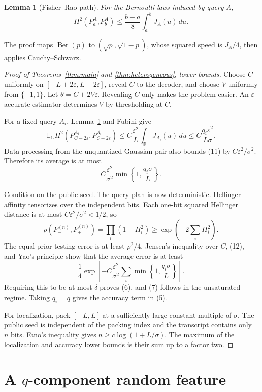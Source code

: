 \documentclass{article}
\newtheorem{lemma}[theorem]{Lemma}
\theoremstyle{definition}
\theoremstyle{remark}
\newcommand{\E}{\mathbb E}
\newcommand{\R}{\mathbb R}
\newcommand{\1}{\mathbf 1}
\newcommand{\Ber}{\operatorname{Ber}}
\begin{document}
\begin{lemma}[Fisher--Rao path]\label{lem:path}
For the Bernoulli laws induced by query \(A\), \[ H^2(P_a^A,P_b^A)\leq\frac{b-a}{8}\int_a^bJ_A(u)\,du. \tag{10} \]
\end{lemma}

The proof maps \(\Ber(p)\) to \((\sqrt p,\sqrt{1-p})\), whose squared speed is \(J_A/4\), then applies Cauchy--Schwarz.

\begin{proof}[Proof of Theorems~\ref{thm:main} and \ref{thm:heterogeneous}, lower bounds]
Choose \(C\) uniformly on \([-L+2\varepsilon,L-2\varepsilon]\), reveal \(C\) to the decoder, and choose \(V\) uniformly from \(\{-1,1\}\). Let \(\theta=C+2V\varepsilon\). Revealing \(C\) only makes the problem easier. An \(\varepsilon\)-accurate estimator determines \(V\) by thresholding at \(C\).

For a fixed query \(A_i\), Lemma~\ref{lem:path} and Fubini give \[ \E_C H^2(P_{C-2\varepsilon}^{A_i},P_{C+2\varepsilon}^{A_i}) \leq C\frac{\varepsilon^2}{L}\int_\R J_{A_i}(u)\,du \leq C\frac{q_i\varepsilon^2}{L\sigma}. \tag{11} \] Data processing from the unquantized Gaussian pair also bounds (11) by \(C\varepsilon^2/\sigma^2\). Therefore its average is at most \[ C\frac{\varepsilon^2}{\sigma^2} \min\left\{1,\frac{q_i\sigma}{L}\right\}. \tag{12} \]

Condition on the public seed. The query plan is now deterministic. Hellinger affinity tensorizes over the independent bits. Each one-bit squared Hellinger distance is at most \(C\varepsilon^2/\sigma^2<1/2\), so \[ \rho(P_-^{(n)},P_+^{(n)}) =\prod_i(1-H_i^2) \geq \exp\left(-2\sum_iH_i^2\right). \] The equal-prior testing error is at least \(\rho^2/4\). Jensen's inequality over \(C\), (12), and Yao's principle show that the average error is at least \[ \frac14\exp\left[ -C\frac{\varepsilon^2}{\sigma^2} \sum_i\min\left\{1,\frac{q_i\sigma}{L}\right\} \right]. \] Requiring this to be at most \(\delta\) proves (6), and (7) follows in the unsaturated regime. Taking \(q_i=q\) gives the accuracy term in (5).

For localization, pack \([-L,L]\) at a sufficiently large constant multiple of \(\sigma\). The public seed is independent of the packing index and the transcript contains only \(n\) bits. Fano's inequality gives \(n\geq c\log(1+L/\sigma)\). The maximum of the localization and accuracy lower bounds is their sum up to a factor two.
\end{proof}

\section{A \(q\)-component random feature}
\end{document}
